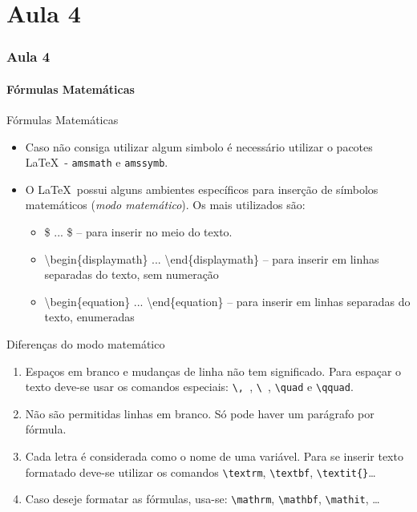
\part{Aula 4}
\section{Aula 4}

\subsection{Fórmulas Matemáticas}
\begin{frame}[fragile]{Fórmulas Matemáticas}
    \begin{itemize}
    \item Caso não consiga utilizar algum simbolo é necessário utilizar o pacotes \LaTeX\ - \verb|amsmath| e \verb|amssymb|.
    \item O \LaTeX\ possui alguns ambientes específicos para inserção de símbolos matemáticos (\textit{modo matemático}). Os mais utilizados são:
        \begin{itemize}
        \item \alert{\$} ... \alert{\$} -- para inserir no meio do texto.
        \item \alert{\textbackslash begin\{displaymath\} ... \textbackslash end\{displaymath\}} -- para inserir em linhas separadas do texto, sem numeração
        \item \alert{\textbackslash begin\{equation\} ... \textbackslash end\{equation\}} -- para inserir em linhas separadas do texto, enumeradas
        \end{itemize}
    \end{itemize}
\end{frame}

\begin{frame}[fragile]{Diferenças do modo matemático}
    \begin{enumerate}
    \item Espaços em branco e mudanças de linha não tem significado. Para espaçar o texto deve-se usar os comandos especiais: \verb|\, |, \verb*|\ |, \verb|\quad| e \verb|\qquad|.
    \item Não são permitidas linhas em branco. Só pode haver um parágrafo por fórmula.
    \item Cada letra é considerada como o nome de uma variável. Para se inserir texto formatado deve-se utilizar os comandos \verb|\textrm|, \verb|\textbf|, \verb|\textit{}|\dots
    \item Caso deseje formatar as fórmulas, usa-se: \verb|\mathrm|, \verb|\mathbf|, \verb|\mathit|, \dots
    \end{enumerate}
\end{frame}

